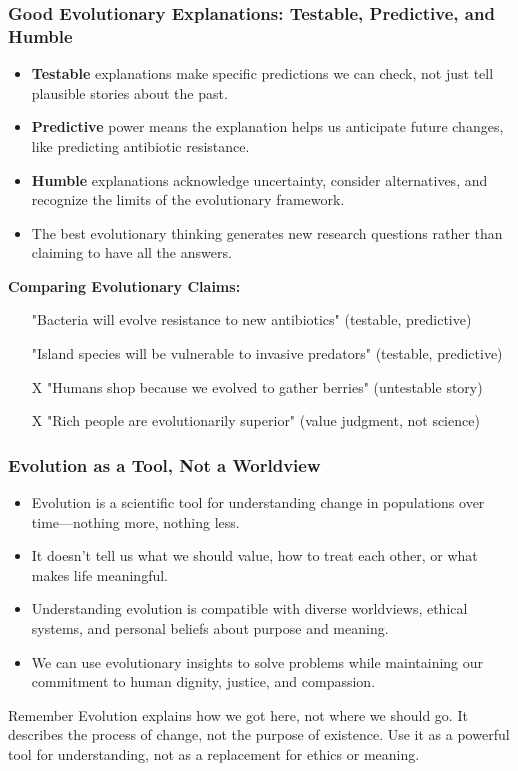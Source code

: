 \documentclass{beamer}
\begin{document}
	\begin{frame}
		\frametitle{Good Evolutionary Explanations: Testable, Predictive, and Humble}
		\begin{itemize}
			\item \textbf{Testable} explanations make specific predictions we can check, not just tell plausible stories about the past.
			\item \textbf{Predictive} power means the explanation helps us anticipate future changes, like predicting antibiotic resistance.
			\item \textbf{Humble} explanations acknowledge uncertainty, consider alternatives, and recognize the limits of the evolutionary framework.
			\item The best evolutionary thinking generates new research questions rather than claiming to have all the answers.
		\end{itemize}
		\begin{example}
			\scriptsize
			\textbf{Comparing Evolutionary Claims:}
			\begin{itemize}
				\item[\checkmark] "Bacteria will evolve resistance to new antibiotics" (testable, predictive)
				\item[\checkmark] "Island species will be vulnerable to invasive predators" (testable, predictive)
				\item[X] "Humans shop because we evolved to gather berries" (untestable story)
				\item[X] "Rich people are evolutionarily superior" (value judgment, not science)
			\end{itemize}
		\end{example}
	\end{frame}
	
	\begin{frame}
		\frametitle{Evolution as a Tool, Not a Worldview}
		\begin{itemize}
			\item Evolution is a scientific tool for understanding change in populations over time—nothing more, nothing less.
			\item It doesn't tell us what we should value, how to treat each other, or what makes life meaningful.
			\item Understanding evolution is compatible with diverse worldviews, ethical systems, and personal beliefs about purpose and meaning.
			\item We can use evolutionary insights to solve problems while maintaining our commitment to human dignity, justice, and compassion.
		\end{itemize}
		\begin{alertblock}{Remember}
			Evolution explains how we got here, not where we should go. It describes the process of change, not the purpose of existence. Use it as a powerful tool for understanding, not as a replacement for ethics or meaning.
		\end{alertblock}
	\end{frame}
	
\end{document}

